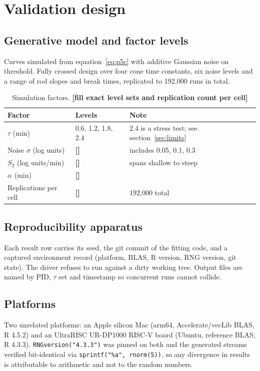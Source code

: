 \documentclass[11pt,a4paper]{article}
\newcommand{\FILL}[1]{\textbf{\textcolor{coneC}{[#1]}}}
\newcommand{\Sii}{S_2}
\begin{document}
\section{Validation design}

\subsection{Generative model and factor levels}
\begin{towrite}
Curves simulated from equation~\eqref{eq:p5c} with additive Gaussian noise
on threshold. Fully crossed design over four cone time constants, six noise
levels and a range of rod slopes and break times, replicated to 192,000
runs in total.
\end{towrite}

\begin{table}[h]
\centering
\caption{Simulation factors. \FILL{fill exact level sets and replication count per cell}}
\begin{tabular}{lll}
\toprule
Factor & Levels & Note \\
\midrule
$\tau$ (min) & 0.6, 1.2, 1.8, 2.4 & 2.4 is a stress test; see section~\ref{sec:limits} \\
Noise $\sigma$ (log units) & \FILL{} & includes 0.05, 0.1, 0.3 \\
$\Sii$ (log units/min) & \FILL{} & spans shallow to steep \\
$\alpha$ (min) & \FILL{} & \\
Replications per cell & \FILL{} & 192,000 total \\
\bottomrule
\end{tabular}
\end{table}

\subsection{Reproducibility apparatus}
\begin{evidence}
Each result row carries its seed, the git commit of the fitting code, and a
captured environment record (platform, BLAS, R version, RNG version, git
state). The driver refuses to run against a dirty working tree. Output files
are named by PID, $\tau$ set and timestamp so concurrent runs cannot collide.
\end{evidence}

\subsection{Platforms}
\begin{evidence}
Two unrelated platforms: an Apple silicon Mac (arm64, Accelerate/vecLib
BLAS, R 4.5.2) and an UltraRISC UR-DP1000 RISC-V board (Ubuntu, reference
BLAS, R 4.3.3). \texttt{RNGversion("4.3.3")} was pinned on both and the
generated streams verified bit-identical via
\texttt{sprintf("\%a", rnorm(5))}, so any divergence in results is
attributable to arithmetic and not to the random numbers.
\end{evidence}
\end{document}

